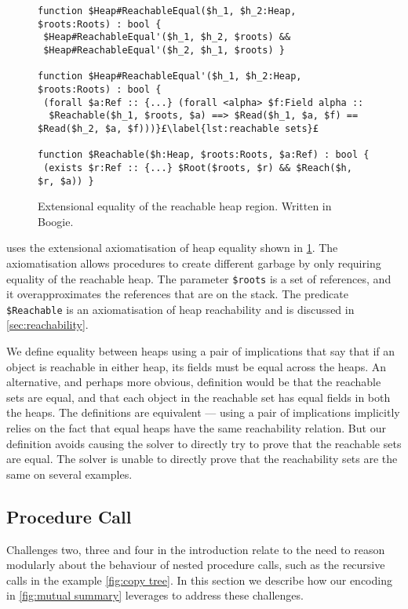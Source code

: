 \documentclass[runningheads,a4paper]{llncs}
\begin{document}
\begin{figure}[tbp]
\begin{lstlisting}[style=Boogie,firstnumber=auto,name=copyex]
function $Heap#ReachableEqual($h_1, $h_2:Heap, $roots:Roots) : bool {
 $Heap#ReachableEqual'($h_1, $h_2, $roots) && 
 $Heap#ReachableEqual'($h_2, $h_1, $roots) }

function $Heap#ReachableEqual'($h_1, $h_2:Heap, $roots:Roots) : bool {
 (forall $a:Ref :: {...} (forall <alpha> $f:Field alpha :: 
  $Reachable($h_1, $roots, $a) ==> $Read($h_1, $a, $f) == $Read($h_2, $a, $f)))}£\label{lst:reachable sets}£ 

function $Reachable($h:Heap, $roots:Roots, $a:Ref) : bool {
 (exists $r:Ref :: {...} $Root($roots, $r) && $Reach($h, $r, $a)) }
\end{lstlisting}
\caption{Extensional equality of the reachable heap region. Written in Boogie.}\label{fig:extensionality}
\end{figure}

\Tool{} uses the extensional axiomatisation of heap equality shown in \cref{fig:extensionality}. The axiomatisation allows procedures to create different garbage by only requiring equality of the reachable heap. The parameter \texttt{\$roots} is a set of references, and it overapproximates the references that are on the stack. The predicate \texttt{\$Reachable} is an axiomatisation of heap reachability and is discussed in \cref{sec:reachability}.

We define equality between heaps using a pair of implications that say that if an object is reachable in either heap, its fields must be equal across the heaps. An alternative, and perhaps more obvious, definition would be that the reachable sets are equal, and that each object in the reachable set has equal fields in both the heaps. The definitions are equivalent --- using a pair of implications implicitly relies on the fact that equal heaps have the same reachability relation. But our definition avoids causing the solver to directly try to prove that the reachable sets are equal. The solver is unable to directly prove that the reachability sets are the same on several examples.

\subsection{Procedure Call}\label{sec:recursion}

Challenges two, three and four in the introduction relate to the need to reason modularly about the behaviour of nested procedure calls, such as the recursive calls in the example \cref{fig:copy tree}. In this section we describe how our encoding in \cref{fig:mutual summary} leverages \metho{} to address these challenges.
\end{document}
